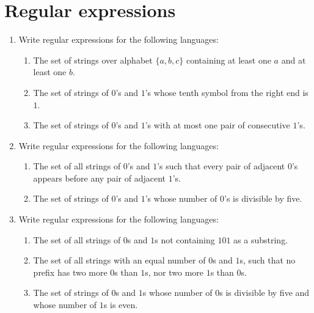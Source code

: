 \documentclass{article}
\theoremstyle{remark}
\begin{document}
\section*{Regular expressions}
\begin{enumerate}
        \item Write regular expressions for the following languages:
        
        \begin{enumerate}
            \item[(a)] The set of strings over alphabet $\{a, b, c\}$ containing at least one $a$ and at least one $b$.
            
            \item[(b)] The set of strings of $0$'s and $1$'s whose tenth symbol from the right end is $1$.
            
            \item[(c)] The set of strings of $0$'s and $1$'s with at most one pair of consecutive $1$'s.
        \end{enumerate}

        \item Write regular expressions for the following languages:
        
        \begin{enumerate}
            \item[(a)] The set of all strings of $0$'s and $1$'s such that every pair of adjacent $0$'s appears before any pair of adjacent $1$'s.
            
            \item[(b)] The set of strings of $0$'s and $1$'s whose number of $0$'s is divisible by five.
        \end{enumerate}

        \item Write regular expressions for the following languages:

        \begin{enumerate}
            \item[(a)] The set of all strings of $0$s and $1$s not containing $101$ as a substring.
            
            \item[(b)] The set of all strings with an equal number of $0$s and $1$s, such that no prefix has two more $0$s than $1$s, nor two more $1$s than $0$s.
            
            \item[(c)] The set of strings of $0$s and $1$s whose number of $0$s is divisible by five and whose number of $1$s is even.
        \end{enumerate}

\end{enumerate}
\end{document}
